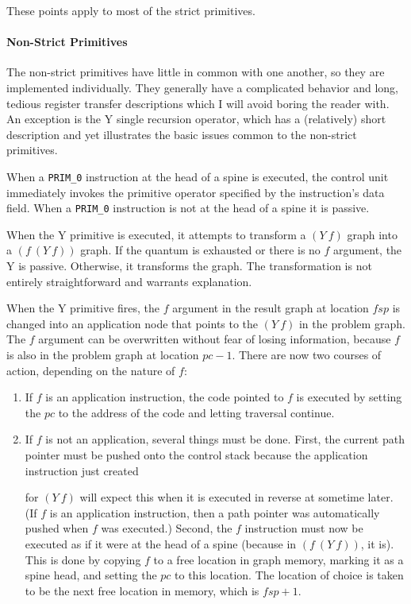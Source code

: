 These points apply to most of the strict primitives.

\paragraph{Non-Strict Primitives}

The non-strict primitives have little in common with one another, so they are implemented
individually. They generally have a complicated behavior and long, tedious register
transfer descriptions which I will avoid boring the reader with. An exception is the Y
single recursion operator, which has a (relatively) short description and yet illustrates
the basic issues common to the non-strict primitives.

When a \texttt{PRIM\_0} instruction at the head of a spine is executed, the control unit
immediately invokes the primitive operator specified by the instruction's data field. When
a \texttt{PRIM\_0} instruction is not at the head of a spine it is passive.

When the Y primitive is executed, it attempts to transform a \((Y\ f)\) graph into a
\((f\ (Y\ f))\) graph. If the quantum is exhausted or there is no \(f\) argument, the Y is
passive. Otherwise, it transforms the graph. The transformation is not entirely
straightforward and warrants explanation.

When the Y primitive fires, the \(f\) argument in the result graph at location \(fsp\) is
changed into an application node that points to the \((Y\ f)\) in the problem graph. The
\(f\) argument can be overwritten without fear of losing information, because \(f\) is also
in the problem graph at location \(pc-1\). There are now two courses of action, depending
on the nature of \(f\):

\begin{enumerate}
\item If \(f\) is an application instruction, the code pointed to \(f\) is executed by
setting the \(pc\) to the address of the code and letting traversal continue.

\item If \(f\) is not an application, several things must be done. First, the current path
pointer must be pushed onto the control stack because the application instruction just
created


for \((Y\ f)\) will expect this when it is executed in reverse at sometime later. (If \(f\)
is an application instruction, then a path pointer was automatically pushed when \(f\) was
executed.) Second, the \(f\) instruction must now be executed as if it were at the head of
a spine (because in \((f\ (Y\ f))\), it is). This is done by copying \(f\) to a free
location in graph memory, marking it as a spine head, and setting the \(pc\) to this
location. The location of choice is taken to be the next free location in memory, which is
\(fsp+1\).
\end{enumerate}

